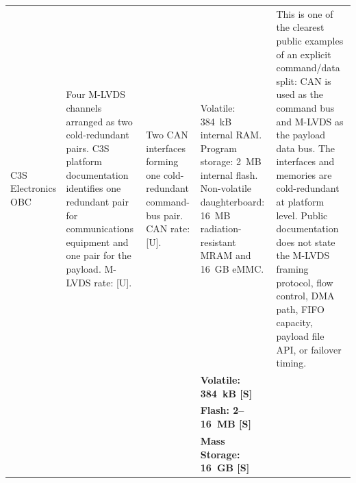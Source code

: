 \documentclass[10pt]{../datasheet}
\let\cite\citep
\begin{document}
\begin{landscape}
\begin{longtable}{|p{3.2cm}|p{4.5cm}|p{4.5cm}|p{4.5cm}|p{5.5cm}|}
    C3S Electronics OBC \cite{c3s_obc_ds, c3s_3u_platform_ds}          &
    Four M-LVDS channels arranged as two cold-redundant pairs. C3S platform
    documentation identifies one redundant pair for communications equipment and
    one pair for the payload. M-LVDS rate: [U].
                                                                       & Two CAN interfaces forming one cold-redundant command-bus pair. CAN rate:
    [U].                                                               & Volatile: 384~kB internal RAM. Program
    storage: 2~MB internal flash. Non-volatile daughterboard: 16~MB
    radiation-resistant MRAM and 16~GB eMMC.                           &
    This is one of the clearest public examples of an explicit command/data
    split: CAN is used as the command bus and M-LVDS as the payload data bus.
    The interfaces and memories are cold-redundant at platform level. Public
    documentation does not state the M-LVDS framing protocol, flow control, DMA
    path, FIFO capacity, payload file API, or failover timing.
    \\
    \cline{2-5}
                                                                       &                                                                            &                                                  & \textbf{Volatile: 384~kB [S]}             & \\
                                                                       &                                                                            &                                                  & \textbf{Flash: 2--16~MB [S]}              & \\
                                                                       &                                                                            &                                                  & \textbf{Mass Storage: 16~GB [S]}          & \\ \hline\hline


\end{longtable}
\end{landscape}
\end{document}

